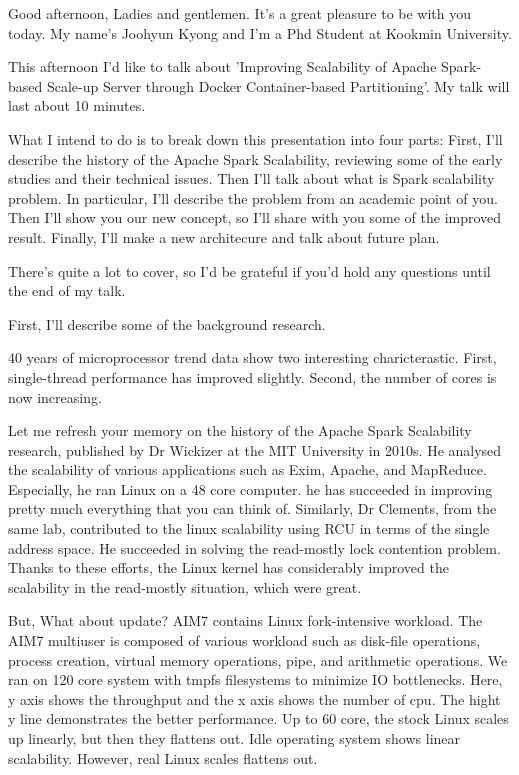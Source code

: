 Good afternoon, Ladies and gentlemen.
It's a great pleasure to be with you today.
My name's Joohyun Kyong and I'm a Phd Student at Kookmin University.

This afternoon I'd like to talk about 'Improving Scalability of Apache
Spark-based Scale-up Server through Docker Container-based Partitioning'.
My talk will last about 10 minutes.

What I intend to do is to break down this presentation into four parts:
First, I'll describe the history of the Apache Spark Scalability, reviewing some
of the early studies and their technical issues.
Then I'll talk about what is Spark scalability problem.
In particular, I'll describe the problem from an academic point of you.
Then I'll show you our new concept, 
so I'll share with you some of the improved result.
Finally, I'll make a new architecure and talk about future plan.

There's quite a lot to cover, so I'd be grateful if you'd hold any questions
until the end of my talk.

First, I'll describe some of the background research.

40 years of microprocessor trend data show two interesting charicterastic.
First, single-thread performance has improved slightly.
Second, the number of cores is now increasing. 

Let me refresh your memory on the history of the Apache Spark Scalability
research, published by Dr Wickizer at the MIT University in 2010s.
He analysed the scalability of various applications such as Exim, Apache, and MapReduce.
Especially, he ran Linux on a 48 core computer.
he has succeeded in improving pretty much everything that you
can think of.
Similarly, Dr Clements, from the same lab, contributed to the linux scalability
using RCU in terms of the single address space.
He succeeded in  solving the read-mostly lock contention problem.
Thanks to these efforts, the Linux kernel has considerably improved the
scalability in the read-mostly situation, which were great.

But, What about update? 
AIM7 contains Linux fork-intensive workload.
The AIM7 multiuser is composed of various workload such as disk-file operations,
process creation, virtual memory operations, pipe, and arithmetic operations.
We ran on 120 core system with tmpfs filesystems to minimize IO bottlenecks.
Here, y axis shows the throughput and the x axis shows the number of cpu.
The hight y line demonstrates the better performance.
Up to 60 core, the stock Linux scales up linearly, but then they flattens out.
Idle operating system shows linear scalability.
However, real Linux scales flattens out.


